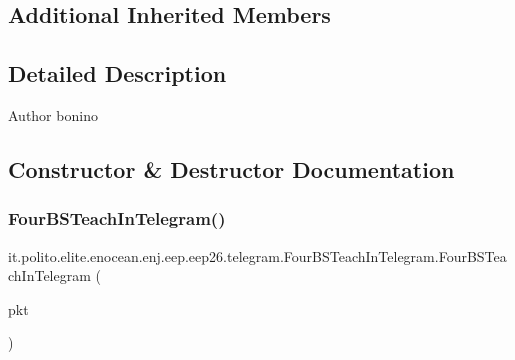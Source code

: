 \subsection*{Additional Inherited Members}


\subsection{Detailed Description}
\begin{DoxyAuthor}{Author}
bonino 
\end{DoxyAuthor}


\subsection{Constructor \& Destructor Documentation}
\hypertarget{classit_1_1polito_1_1elite_1_1enocean_1_1enj_1_1eep_1_1eep26_1_1telegram_1_1_four_b_s_teach_in_telegram_a42267971f5c3a51c872612701dc17c2c}{}\label{classit_1_1polito_1_1elite_1_1enocean_1_1enj_1_1eep_1_1eep26_1_1telegram_1_1_four_b_s_teach_in_telegram_a42267971f5c3a51c872612701dc17c2c} 
\subsubsection{\texorpdfstring{Four\+B\+S\+Teach\+In\+Telegram()}{FourBSTeachInTelegram()}\hspace{0.1cm}{\footnotesize\ttfamily [1/2]}}
{\footnotesize\ttfamily it.\+polito.\+elite.\+enocean.\+enj.\+eep.\+eep26.\+telegram.\+Four\+B\+S\+Teach\+In\+Telegram.\+Four\+B\+S\+Teach\+In\+Telegram (\begin{DoxyParamCaption}\item[{\hyperlink{classit_1_1polito_1_1elite_1_1enocean_1_1protocol_1_1serial_1_1v3_1_1network_1_1packet_1_1_e_s_p3_packet}{E\+S\+P3\+Packet}}]{pkt }\end{DoxyParamCaption})}


